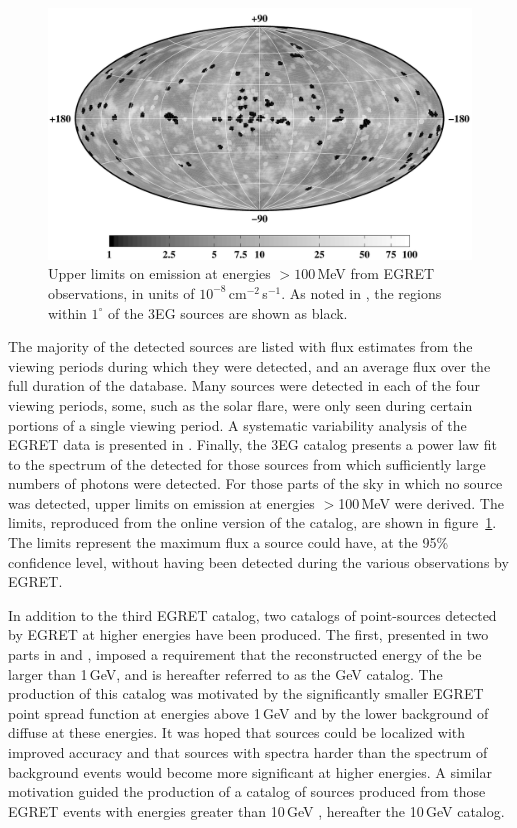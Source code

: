 \begin{figure}[t]
\includegraphics[draft=false,angle=270,width=\textwidth]{plots/chap-introduction/egret_ul.pdf}
\caption{\label{FIG::INTRODUCTION::3RDEGRETUL} 
Upper limits on \Gray emission at energies $>100$\,MeV from EGRET
observations, in units of $10^{-8}$\,cm$^{-2}$\,s$^{-1}$. As noted in
\citet{REF::HARTMAN::APJS1999}, the regions within $1^\circ$ of the
3EG sources are shown as black.}
\end{figure}

The majority of the detected sources are listed with flux estimates
from the viewing periods during which they were detected, and an
average flux over the full duration of the database. Many sources were
detected in each of the four viewing periods, some, such as the solar
flare, were only seen during certain portions of a single viewing
period. A systematic variability analysis of the EGRET data is
presented in \citet{REF::NOLAN::APJ2003}. Finally, the 3EG catalog
presents a power law fit to the spectrum of the detected \Grays for
those sources from which sufficiently large numbers of photons were
detected. For those parts of the sky in which no source was detected,
upper limits on emission at energies $>$100\,MeV were derived. The
limits, reproduced from the online version of the catalog, are shown
in figure~\ref{FIG::INTRODUCTION::3RDEGRETUL}. The limits represent
the maximum flux a source could have, at the 95\% confidence level,
without having been detected during the various observations by EGRET.

In addition to the third EGRET catalog, two catalogs of point-sources
detected by EGRET at higher energies have been produced. The
first, presented in two parts in \citet{REF::LAMB::APJ1997} and
\citet{REF::MACOMB::ICRC1999}, imposed a requirement that the
reconstructed energy of the \Gray be larger than 1\,GeV, and is
hereafter referred to as the GeV catalog. The production of this
catalog was motivated by the significantly smaller EGRET point spread
function at energies above 1\,GeV and by the lower background of
diffuse \Grays at these energies. It was hoped that sources could be
localized with improved accuracy and that sources with spectra harder
than the spectrum of background events would become more significant
at higher energies. A similar motivation guided the production of a
catalog of \Gray sources produced from those EGRET events with
energies greater than 10\,GeV
\citep{REF::DINGUS::GAMMA2001}, hereafter the 10\,GeV catalog. 

